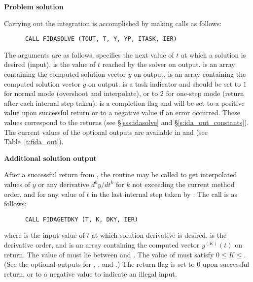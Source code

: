\begin{Steps}

\item {\bf Problem solution}

  Carrying out the integration is accomplished by making calls as follows:
\begin{verbatim}
      CALL FIDASOLVE (TOUT, T, Y, YP, ITASK, IER)
\end{verbatim}
  The arguments are as follows.
   specifies the next value of $t$ at which a solution is desired (input).
   is the value of $t$ reached by the solver on output.
   is an array containing the computed solution vector $y$ on output.
   is an array containing the computed solution vector $\dot{y}$ on output.
   is a task indicator and should be set to $1$ for normal mode
  (overshoot  and interpolate), or to $2$ for one-step mode
  (return after each internal step taken).
   is a completion flag and will be set to a positive value upon
  successful return or to a negative value if an error occurred. These values
  correspond to the  returns (see \S\ref{sss:idasolve} and \S\ref{s:ida_out_constants}).
  The current values of the optional outputs are available in  and
   (see Table~\ref{t:fida_out}).

\item {\bf Additional solution output}

  After a successful return from , the routine  may
  be called to get interpolated values of $y$ or any derivative $d^k y/dt^k$
  for $k$ not exceeding the current method order, and for any value of $t$ in
  the last internal step taken by {\ida}.  The call is as follows:
\begin{verbatim}
      CALL FIDAGETDKY (T, K, DKY, IER)
\end{verbatim}
  where
   is the input value of $t$ at which solution derivative is desired,
   is the derivative order, and
   is an array containing the computed vector $y^{(K)}(t)$ on return.
  The value of  must lie between  and .
  The value of  must satisfy $0 \leq K \leq $. (See the
  optional outputs for , , and .)
  The return flag  is set to $0$ upon successful return, or to a
  negative value to indicate an illegal input.


\end{Steps}
